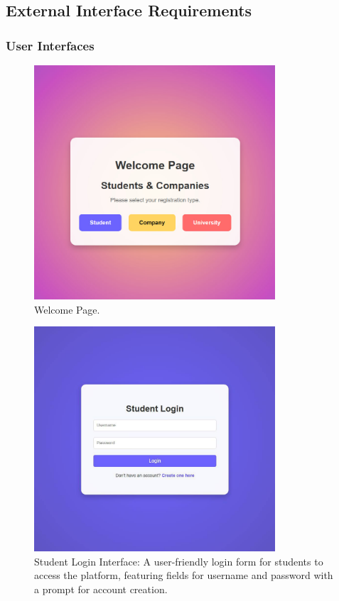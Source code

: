 \subsection{External Interface Requirements}
\subsubsection{User Interfaces}

\begin{figure}[H]
\centering
\includegraphics[width=0.8\textwidth]{Images/1.jpg}
\caption{\label{fig:metamodel1}Welcome Page.}
\end{figure}

\begin{figure}[H]
\centering
\includegraphics[width=0.8\textwidth]{Images/2.jpg}
\caption{\label{fig:metamodel2}Student Login Interface: A user-friendly login form for students to access the platform, featuring fields for username and password with a prompt for account creation.}
\end{figure}

